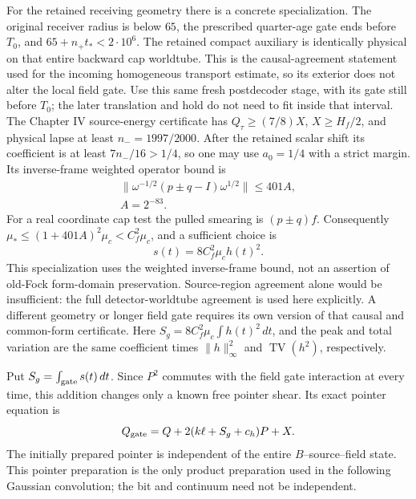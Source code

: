 For the retained receiving geometry there is a concrete specialization.
The original receiver radius is below $65$, the prescribed quarter-age
gate ends before $T_0$, and $65+n_+t_*<2\cdot10^6$. The retained compact
auxiliary is identically physical on that entire backward cap worldtube.
This is the causal-agreement statement used for the incoming homogeneous
transport estimate, so its exterior does not alter the local field gate.
Use this same fresh postdecoder stage, with its gate still before $T_0$;
the later translation and hold do not need to fit inside that interval.
The Chapter IV source-energy certificate has
$Q_\tau\geq(7/8)X$, $X\geq H_f/2$, and physical lapse at least
$n_-=1997/2000$. After the retained scalar shift its coefficient is at
least $7n_-/16>1/4$, so one may use $a_0=1/4$ with a strict margin.
Its inverse-frame weighted operator bound is
\begin{equation}
\begin{gathered}
\|\omega^{-1/2}(p\mathbin{\pm}q-I)\omega^{1/2}\|
        \leq401A,\\
 A=2^{-83}.
\end{gathered}
\label{eq:chvidr-detector-frame-dual}
\end{equation}
For a real coordinate cap test the pulled smearing is $(p\mathbin{\pm}q)f$.
Consequently $\mu_*\leq(1+401A)^2\mu_c<C_f^2\mu_c$, and a sufficient
choice is
\begin{equation}
 s(t)=8C_f^2\mu_c h(t)^2.
 \label{eq:chvidr-concrete-gate-stabilizer}
\end{equation}
This specialization uses the weighted inverse-frame bound, not an
assertion of old-Fock form-domain preservation. Source-region agreement
alone would be insufficient: the full detector-worldtube agreement is
used here explicitly. A different geometry or longer field gate requires
its own version of that causal and common-form certificate. Here
$S_g=8C_f^2\mu_c\int h(t)^2\,dt$, and the peak and total variation are
the same coefficient times $\|h\|_\infty^2$ and
$\operatorname{TV}(h^2)$, respectively.

Put $S_g=\int_{\rm gate}s(t)\,dt$. Since $P^2$ commutes with the field
gate interaction at every time, this addition changes only a known free
pointer shear. Its exact pointer equation is
\begin{equation}
 Q_{\rm gate}=Q+2(k\ell+S_g+c_h)P+X.
 \label{eq:chvidr-exact-gate-pointer}
\end{equation}
The initially prepared pointer is independent of the entire $B$--source--field
state. This pointer preparation is the only product preparation used in
the following Gaussian convolution; the bit and continuum need not be
independent.

